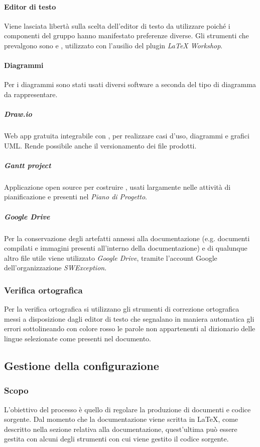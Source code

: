 \paragraph{Editor di testo}
Viene lasciata libertà sulla scelta dell'editor di testo da utilizzare poiché i componenti del gruppo hanno manifestato preferenze diverse. Gli strumenti che prevalgono sono \textit{} e \textit{}, utilizzato con l'ausilio del plugin \textit{LaTeX Workshop}.

\paragraph{Diagrammi}
Per i diagrammi sono stati usati diversi software a seconda del tipo di diagramma da rappresentare.

\subparagraph{\textit{Draw.io}}
Web app gratuita integrabile con , per realizzare casi d'uso, diagrammi e grafici UML. Rende possibile anche il versionamento dei file prodotti.

\subparagraph{\textit{Gantt project}}
Applicazione open source per costruire , usati largamente nelle attività di pianificazione e presenti nel \textit{Piano di Progetto}.

\subparagraph{\textit{Google Drive}}
Per la conservazione degli artefatti annessi alla documentazione (e.g. documenti compilati e immagini presenti all'interno della documentazione) e di qualunque altro file utile viene utilizzato \textit{Google Drive}, tramite l'account Google dell'organizzazione \textit{SWException}.

\subsubsection{Verifica ortografica}
Per la verifica ortografica si utilizzano gli strumenti di correzione ortografica messi a disposizione dagli editor di testo che segnalano in maniera automatica gli errori sottolineando con colore rosso le parole non appartenenti al dizionario delle lingue selezionate come presenti nel documento.

\subsection{Gestione della configurazione} \label{_gestioneDellaConfigurazione}
\subsubsection{Scopo}
L'obiettivo del processo è quello di regolare la produzione di documenti e codice sorgente.
Dal momento che la documentazione viene scritta in \LaTeX, come descritto nella sezione relativa
alla documentazione, quest'ultima può essere gestita con alcuni degli strumenti con
cui viene gestito il codice sorgente.

